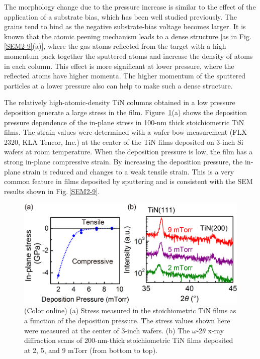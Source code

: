 \documentclass{report}
\begin{document}
The morphology change due to the pressure increase is similar to the effect of the application of a substrate bias, which has been well studied previously.\cite{Kumar1988} The grains tend to bind as the negative substrate-bias voltage becomes larger. It is known that the atomic peening mechanism leads to a dense structure [as in Fig.\,\ref{SEM2-9}(a)], where the gas atoms reflected from the target with a high momentum pack together the sputtered atoms and increase the density of atoms in each column.\cite{Thornton1985} This effect is more significant at lower pressure, where the reflected atoms have higher momenta. The higher momentum of the sputtered particles at a lower pressure also can help to make such a dense structure.

The relatively high-atomic-density TiN columns obtained in a low pressure deposition generate a large stress in the film. Figure \,\ref{Stress-XRD}(a) shows the deposition pressure dependence of the in-plane stress in 100-nm thick stoichiometric TiN films. The strain values were determined with a wafer bow measurement (FLX-2320, KLA Tencor, Inc.) at the center of the TiN films deposited on 3-inch Si wafers  at room temperature. When the deposition pressure is low, the film has a strong in-plane compressive strain. By increasing the deposition pressure, the in-plane strain is reduced and changes to a weak tensile strain. This is a very common feature in films deposited by sputtering and is consistent with the SEM results shown in Fig.\,\ref{SEM2-9}.

\begin{figure}
\begin{center}
\includegraphics{Stress-XRD.jpg}
\end{center}
\caption{(Color online) (a) Stress measured in the stoichiometric TiN films as a function of the deposition pressure. The stress values shown here were measured at the center of 3-inch wafers. (b) The $\omega$-2$\theta$ x-ray diffraction scans of 200-nm-thick stoichiometric TiN films deposited at 2, 5, and 9 mTorr (from bottom to top).}
\label{Stress-XRD}
\end{figure}
\end{document}
